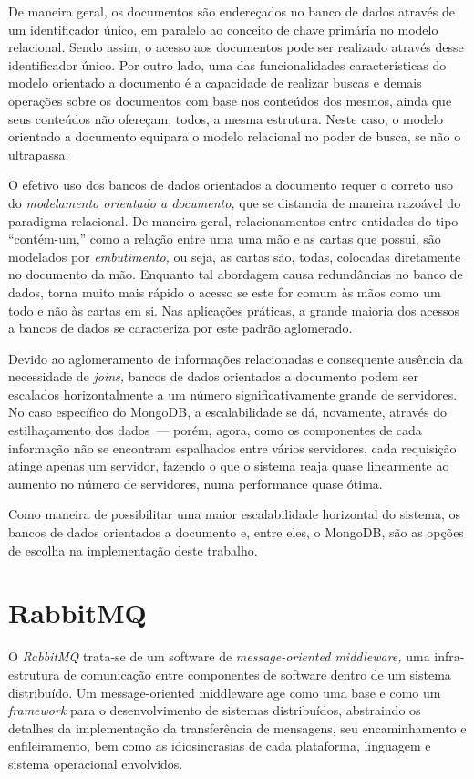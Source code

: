 \documentclass[ruledheader, 12pt]{abnt}
\begin{document}
De maneira geral, os documentos são endereçados no banco de dados através de um identificador único, em paralelo ao conceito de chave primária no modelo relacional. Sendo assim, o acesso aos documentos pode ser realizado através desse identificador único. Por outro lado, uma das funcionalidades características do modelo orientado a documento é a capacidade de realizar buscas e demais operações sobre os documentos com base nos conteúdos dos mesmos, ainda que seus conteúdos não ofereçam, todos, a mesma estrutura. Neste caso, o modelo orientado a documento equipara o modelo relacional no poder de busca, se não o ultrapassa.

O efetivo uso dos bancos de dados orientados a documento requer o correto uso do \emph{modelamento orientado a documento,} que se distancia de maneira razoável do paradigma relacional. De maneira geral, relacionamentos entre entidades do tipo ``contém-um,'' como a relação entre uma uma mão e as cartas que possui, são modelados por \emph{embutimento,} ou seja, as cartas são, todas, colocadas diretamente no documento da mão. Enquanto tal abordagem causa redundâncias no banco de dados, torna muito mais rápido o acesso se este for comum às mãos como um todo e não às cartas em si. Nas aplicações práticas, a grande maioria dos acessos a bancos de dados se caracteriza por este padrão aglomerado.

Devido ao aglomeramento de informações relacionadas e consequente ausência da necessidade de \emph{joins,} bancos de dados orientados a documento podem ser escalados horizontalmente a um número significativamente grande de servidores. No caso específico do MongoDB, a escalabilidade se dá, novamente, através do estilhaçamento dos dados~--- porém, agora, como os componentes de cada informação não se encontram espalhados entre vários servidores, cada requisição atinge apenas um servidor, fazendo o que o sistema reaja quase linearmente ao aumento no número de servidores, numa performance quase ótima.

Como maneira de possibilitar uma maior escalabilidade horizontal do sistema, os bancos de dados orientados a documento e, entre eles, o MongoDB, são as opções de escolha na implementação deste trabalho.

\section{RabbitMQ}

O \emph{RabbitMQ} trata-se de um software de \emph{message-oriented middleware,} uma infra-estrutura de comunicação entre componentes de software dentro de um sistema distribuído. Um message-oriented middleware age como uma base e como um \emph{framework} para o desenvolvimento de sistemas distribuídos, abstraindo os detalhes da implementação da transferência de mensagens, seu encaminhamento e enfileiramento, bem como as idiosincrasias de cada plataforma, linguagem e sistema operacional envolvidos.
\end{document}
